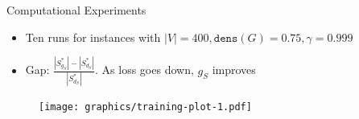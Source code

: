 \documentclass{beamer}
\newcommand{\backupend}{
   \setcounter{framenumber}{\value{finalframe}}
}
\begin{document}
\begin{frame}{Computational Experiments}
    \begin{itemize}
        \item Ten runs for instances with $|V| = 400, \mathtt{dens}(G) = 0.75, \gamma=0.999$
        \item Gap: $\frac{|S^*_{g_S}| - |S^*_{d_S}|}{|S^*_{d_S}|}$. As loss goes down, $g_S$ improves
    \end{itemize} 
    \begin{figure}
        \centering
        \texttt{[image: graphics/training-plot-1.pdf]}
    \end{figure}
\end{frame}



\backupend
\end{document}
